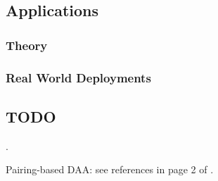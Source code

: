 \subsection{Applications}
\label{ssec:daaapplication}

\subsubsection{Theory}
\label{sssec:daatheoryapp}

\subsubsection{Real World Deployments}
\label{sssec:daarwdeploy}

\subsection{TODO}

\cite{cdl16,cdl16b,ccd+17,cdl17,cu15}.

Pairing-based DAA: see references in page 2 of \cite{bfg+11}.

